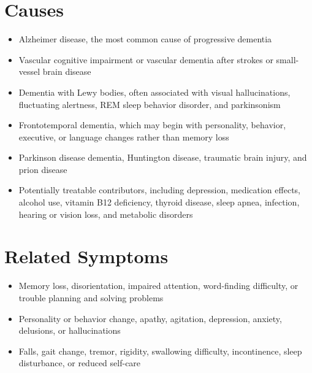 \section*{Causes}
\begin{itemize}
  \item Alzheimer disease, the most common cause of progressive dementia
  \item Vascular cognitive impairment or vascular dementia after strokes or small-vessel brain disease
  \item Dementia with Lewy bodies, often associated with visual hallucinations, fluctuating alertness, REM sleep behavior disorder, and parkinsonism
  \item Frontotemporal dementia, which may begin with personality, behavior, executive, or language changes rather than memory loss
  \item Parkinson disease dementia, Huntington disease, traumatic brain injury, and prion disease
  \item Potentially treatable contributors, including depression, medication effects, alcohol use, vitamin B12 deficiency, thyroid disease, sleep apnea, infection, hearing or vision loss, and metabolic disorders
\end{itemize}

\section*{Related Symptoms}
\begin{itemize}
  \item Memory loss, disorientation, impaired attention, word-finding difficulty, or trouble planning and solving problems
  \item Personality or behavior change, apathy, agitation, depression, anxiety, delusions, or hallucinations
  \item Falls, gait change, tremor, rigidity, swallowing difficulty, incontinence, sleep disturbance, or reduced self-care
\end{itemize}

